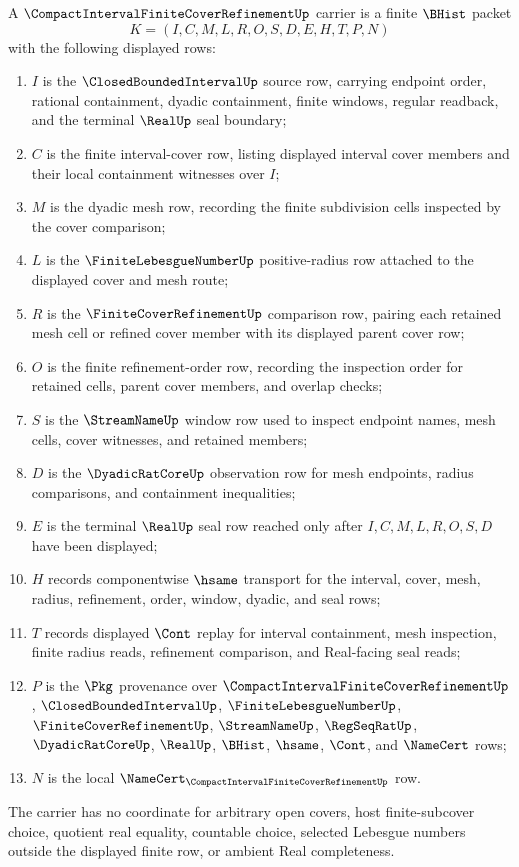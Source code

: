 \begin{definition}
\label{def:compact-interval-finite-cover-refinement-carrier}
A $\CompactIntervalFiniteCoverRefinementUp$ carrier is a finite $\BHist$ packet
$$
K=(I,C,M,L,R,O,S,D,E,H,T,P,N)
$$
with the following displayed rows:
\begin{enumerate}
\item $I$ is the $\ClosedBoundedIntervalUp$ source row, carrying endpoint order, rational containment, dyadic containment, finite windows, regular readback, and the terminal $\RealUp$ seal boundary;
\item $C$ is the finite interval-cover row, listing displayed interval cover members and their local containment witnesses over $I$;
\item $M$ is the dyadic mesh row, recording the finite subdivision cells inspected by the cover comparison;
\item $L$ is the $\FiniteLebesgueNumberUp$ positive-radius row attached to the displayed cover and mesh route;
\item $R$ is the $\FiniteCoverRefinementUp$ comparison row, pairing each retained mesh cell or refined cover member with its displayed parent cover row;
\item $O$ is the finite refinement-order row, recording the inspection order for retained cells, parent cover members, and overlap checks;
\item $S$ is the $\StreamNameUp$ window row used to inspect endpoint names, mesh cells, cover witnesses, and retained members;
\item $D$ is the $\DyadicRatCoreUp$ observation row for mesh endpoints, radius comparisons, and containment inequalities;
\item $E$ is the terminal $\RealUp$ seal row reached only after $I,C,M,L,R,O,S,D$ have been displayed;
\item $H$ records componentwise $\hsame$ transport for the interval, cover, mesh, radius, refinement, order, window, dyadic, and seal rows;
\item $T$ records displayed $\Cont$ replay for interval containment, mesh inspection, finite radius reads, refinement comparison, and Real-facing seal reads;
\item $P$ is the $\Pkg$ provenance over $\CompactIntervalFiniteCoverRefinementUp$, $\ClosedBoundedIntervalUp$, $\FiniteLebesgueNumberUp$, $\FiniteCoverRefinementUp$, $\StreamNameUp$, $\RegSeqRatUp$, $\DyadicRatCoreUp$, $\RealUp$, $\BHist$, $\hsame$, $\Cont$, and $\NameCert$ rows;
\item $N$ is the local $\NameCert_{\CompactIntervalFiniteCoverRefinementUp}$ row.
\end{enumerate}
The carrier has no coordinate for arbitrary open covers, host finite-subcover choice, quotient real equality, countable choice, selected Lebesgue numbers outside the displayed finite row, or ambient Real completeness.
\end{definition}

